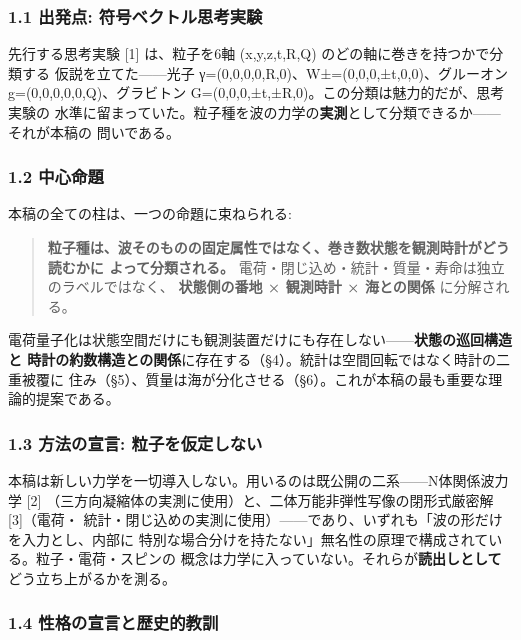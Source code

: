 \documentclass[
]{ltjsarticle}
\begin{document}
\subsubsection{1.1 出発点:
符号ベクトル思考実験}\label{ux51faux767aux70b9-ux7b26ux53f7ux30d9ux30afux30c8ux30ebux601dux8003ux5b9fux9a13}

先行する思考実験 {[}1{]} は、粒子を6軸 (x,y,z,t,R,Q)
のどの軸に巻きを持つかで分類する 仮説を立てた------光子
γ=(0,0,0,0,R,0)、W±=(0,0,0,±t,0,0)、グルーオン
g=(0,0,0,0,0,Q)、グラビトン
G=(0,0,0,±t,±R,0)。この分類は魅力的だが、思考実験の
水準に留まっていた。粒子種を波の力学の\textbf{実測}として分類できるか------それが本稿の
問いである。

\subsubsection{1.2 中心命題}\label{ux4e2dux5fc3ux547dux984c}

本稿の全ての柱は、一つの命題に束ねられる:

\begin{quote}
\textbf{粒子種は、波そのものの固定属性ではなく、巻き数状態を観測時計がどう読むかに
よって分類される。}
電荷・閉じ込め・統計・質量・寿命は独立のラベルではなく、
\textbf{状態側の番地 × 観測時計 × 海との関係} に分解される。
\end{quote}

電荷量子化は状態空間だけにも観測装置だけにも存在しない------\textbf{状態の巡回構造と
時計の約数構造との関係}に存在する（§4）。統計は空間回転ではなく時計の二重被覆に
住み（§5）、質量は海が分化させる（§6）。これが本稿の最も重要な理論的提案である。

\subsubsection{1.3 方法の宣言:
粒子を仮定しない}\label{ux65b9ux6cd5ux306eux5ba3ux8a00-ux7c92ux5b50ux3092ux4eeeux5b9aux3057ux306aux3044}

本稿は新しい力学を一切導入しない。用いるのは既公開の二系------N体関係波力学
{[}2{]} （三方向凝縮体の実測に使用）と、二体万能非弾性写像の閉形式厳密解
{[}3{]}（電荷・
統計・閉じ込めの実測に使用）------であり、いずれも「波の形だけを入力とし、内部に
特別な場合分けを持たない」無名性の原理で構成されている。粒子・電荷・スピンの
概念は力学に入っていない。それらが\textbf{読出しとして}どう立ち上がるかを測る。

\subsubsection{1.4
性格の宣言と歴史的教訓}\label{ux6027ux683cux306eux5ba3ux8a00ux3068ux6b74ux53f2ux7684ux6559ux8a13}
\end{document}
